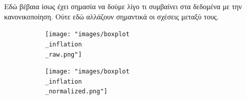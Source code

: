 \documentclass[a4paper,twoside,10pt]{article}
\begin{document}
Εδώ βέβαια ίσως έχει σημασία να δούμε λίγο τι συμβαίνει στα δεδομένα με την κανονικοποίηση. Ούτε εδώ αλλάζουν σημαντικά οι σχέσεις μεταξύ τους.
\begin{figure}[H]
	\centering
	\begin{subfigure}[]{0.8\textwidth}
		\centering
		\texttt{[image: "images/boxplot\\\_inflation\\\_raw.png"]}
		\caption{}
		\label{fig:boxplot-Inflation-normalized-vs-country}
	\end{subfigure}
	\begin{subfigure}[]{0.8\textwidth}
		\texttt{[image: "images/boxplot\\\_inflation\\\_normalized.png"]}
		\caption{}
		\label{fig:boxplot-inflation-vs-country}
	\end{subfigure}
\end{figure}
\end{document}
